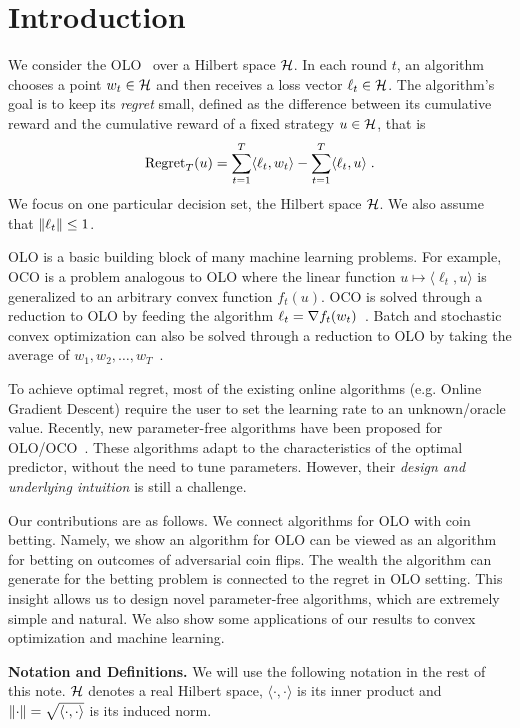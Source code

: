\section{Introduction}
\label{section:introduction}

We consider the \ac{OLO}~\citep{Cesa-Bianchi-Lugosi-2006, Shalev-Shwartz-2011}
over a Hilbert space $\mathcal{H}$. In each round $t$, an algorithm chooses a point $w_t
\in \mathcal{H}$ and then receives a loss vector $\ell_t \in \mathcal{H}$. The algorithm's goal is
to keep its \emph{regret} small, defined as the difference between its
cumulative reward and the cumulative reward of a fixed strategy $u \in \mathcal{H}$,
that is
\[
\operatorname{Regret}_T(u) = \sum_{t=1}^T \langle \ell_t, w_t \rangle - \sum_{t=1}^T \langle \ell_t, u \rangle  \; .
\]
We focus on one particular decision set, the Hilbert space $\mathcal{H}$.  We also assume
that $\left\|{\ell_t}\right\| \le 1$.

\ac{OLO} is a basic building block of many machine learning problems. For
example, \ac{OCO} is a problem analogous to \ac{OLO} where
the linear function $u \mapsto \langle \ell_t, u \rangle$
is generalized to an arbitrary convex function $f_t(u)$. \ac{OCO} is solved
through a reduction to \ac{OLO} by feeding the algorithm $\ell_t = \nabla
f_t(w_t)$~\citep{Shalev-Shwartz-2011}.  Batch and stochastic convex
optimization can also be solved through a reduction to \ac{OLO} by
taking the average of $w_1, w_2, \dots, w_T$~\citep{Shalev-Shwartz-2011}.

To achieve optimal regret, most of the existing online algorithms (e.g.  Online
Gradient Descent) require the user to set the learning rate to an
unknown/oracle value. Recently, new parameter-free algorithms have been
proposed for \ac{OLO}/\ac{OCO}~\citep{Chaudhuri-Freund-Hsu-2009,
Chernov-Vovk-2010, Streeter-McMahan-2012, Orabona-2013, McMahan-Abernethy-2013,
McMahan-Orabona-2014, Luo-Schapire-2014, Orabona-2014, Luo-Schapire-2015, Koolen-van-Erven-2015, Orabona-Pal-2016-parameter-free}.  These algorithms adapt to the characteristics of the
optimal predictor, without the need to tune parameters. However, their
\emph{design and underlying intuition} is still a challenge.

Our contributions are as follows. We connect algorithms for \ac{OLO} with coin
betting. Namely, we show an algorithm for \ac{OLO} can be viewed as an
algorithm for betting on outcomes of adversarial coin flips. The wealth the
algorithm can generate for the betting problem is connected to the regret in
\ac{OLO} setting. This insight allows us to design novel parameter-free
algorithms, which are extremely simple and natural. We also show some
applications of our results to convex optimization and machine learning.

\noindent\textbf{Notation and Definitions.}
We will use the following notation in the rest of this note.  $\mathcal{H}$ denotes
a real Hilbert space, $\langle \cdot, \cdot \rangle$ is its inner product and
$\left\|{\cdot}\right\| = \sqrt{\langle \cdot, \cdot \rangle}$ is its induced norm.
